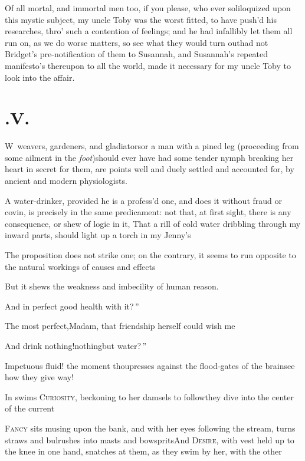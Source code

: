 \documentclass{article}
\begin{document}
Of all mortal, and immortal men too, if you please, who ever soliloquized upon this
mystic subject, my uncle Toby was the worst fitted, to have push’d his researches,
thro’ such a contention of feelings; and he had infallibly let them all run on, as
we do worse matters, so see what they would turn out\tsh had not Bridget’s
pre-notification of them to\break
Susannah, and Susannah’s repeated manifesto’s thereupon
to all the world, made it necessary for my uncle Toby to look into the affair.

\vfill{}\eject
\section{.\enspace V.}

\lettrine{W}{\,} weavers, gardeners, and
gla\-diators\tsk or a man with a pined leg (proceeding from some
ailment in\break
the \textit{foot})\tsk should ever have had some tender
nymph breaking her heart in secret for them, are points well and
duely settled and accounted for, by ancient and modern
physiologists.

A water-drinker, provided he is a profess’d one, and does
it without fraud or covin, is precisely in the same predicament:
not that, at first sight, there is any consequence, or shew of
logic in it,\break
\lqq That a rill of cold water dribbling\break
\lqq through my inward parts, should light\break
\lqq up a torch in my Jenny’s\tsk{}

\tsh The proposition does not strike one; on the
contrary, it seems to run opposite to the natural workings of causes and
effects\tsh

But it shews the weakness and imbecility of human reason.

\tsh \lqq And in perfect good health\break
\lqq with it?\,”

\tsk The most perfect,\tsk Madam, that\break
friendship herself could wish me\tsh

\tsk \lqq And drink nothing!\tsk nothing\break\lqq but water?\,”

\tsk Impetuous fluid! the moment thou\break presses against the
flood-gates of the brain\tsk see how they give
way!\tsh{}

In swims \textsc{Curiosity}, beckoning to her damsels to
follow\tsk they dive into the center of the
current\tsh

\textsc{Fancy} sits musing upon the bank, and with her
eyes following the stream, turns straws and bulrushes into masts
and bowsprits\tsh And \textsc{Desire}, with vest
held up to the knee in one hand, snatches at them, as they swim by
her, with the other\tsh
\end{document}
